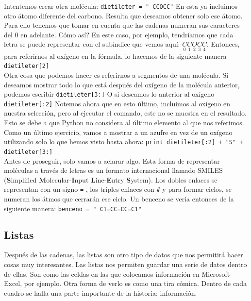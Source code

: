 \documentclass[10pt,letterpaper]{article}
\newcommand{\inlinecode}[1]{
\colorbox{light-gray}{\texttt{#1}}
}
\begin{document}
Intentemos crear otra mol\'ecula: \inlinecode{dietileter = "\ \hspace{-2mm}CCOCC"} En esta ya incluimos otro \'atomo diferente del carbono. Resulta que deseamos obtener solo ese \'atomo. Para ello tenemos que tomar en cuenta que las cadenas numeran sus caracteres del 0 en adelante. C\'omo as\'i? En este caso, por ejemplo, tendr\'iamos que cada letra se puede representar con el sub\'indice que vemos aqu\'i: $\underset{0}{C} \underset{1}{C} \underset{2}{O} \underset{3}{C} \underset{4}{C}$. Entonces, para referirnos al ox\'igeno en la f\'ormula, lo hacemos de la siguiente manera \inlinecode{dietileter[2]}\\

Otra cosa que podemos hacer es referirnos a segmentos de una mol\'ecula. Si deseamos mostrar todo lo que est\'a despu\'es del ox\'igeno de la mol\'ecula anterior, podemos escribir \inlinecode{dietileter[3:]} O si deseamos lo anterior al ox\'igeno \inlinecode{dietileter[:2]} Notemos ahora que en esto \'ultimo, incluimos al ox\'igeno en nuestra selecci\'on, pero al ejecutar el comando, este no se muestra en el resultado. Esto se debe a que Python no considera al \'ultimo elemento al que nos referimos. Como un \'ultimo ejercicio, vamos a mostrar a un azufre en vez de un ox\'igeno utilizando solo lo que hemos visto hasta ahora: \inlinecode{print dietileter[:2] + "S"\ + dietileter[3:]}\\

Antes de proseguir, solo vamos a aclarar algo. Esta forma de representar mol\'eculas a trav\'es de letras es un formato internacional llamado SMILES (\textbf{S}implified \textbf{M}olecular-\textbf{I}nput \textbf{L}ine-\textbf{E}ntry \textbf{S}ystem). Los dobles enlaces se representan con un signo \inlinecode{=}, los triples enlaces con \inlinecode{\#} y para formar ciclos, se numeran los \'atmos que cerrar\'an ese ciclo. Un benceno se ver\'ia entonces de la siguiente manera: \inlinecode{benceno = "\ \hspace{-2mm}C1=CC=CC=C1"}

\subsection{Listas}
Despu\'es de las cadenas, las listas son otro tipo de datos que nos permitir\'a hacer cosas muy interesantes. Las listas nos permiten guardar una serie de datos dentro de ellas. Son como las celdas en las que colocamos informaci\'on en Microsoft Excel, por ejemplo. Otra forma de verlo es como una tira c\'omica. Dentro de cada cuadro se halla una parte importante de la historia: informaci\'on.\\
\end{document}
